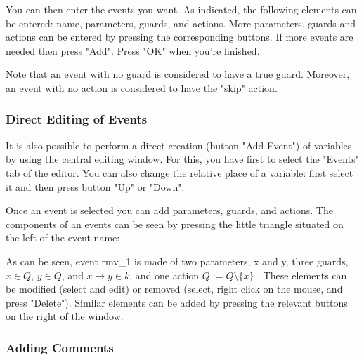 You can then enter the events you want. As indicated, the following elements can be entered: name, parameters, guards, and actions. More parameters, guards and actions can be entered by pressing the corresponding buttons. If more events are needed then press "Add". Press "OK" when you’re finished.

Note that an event with no guard is considered to have a true guard. Moreover, an event with no action is considered to have the "skip" action. 

\subsubsection{Direct Editing of Events}

It is also possible to perform a direct creation (button "Add Event") of variables by using the central editing window. For this, you have first to select the "Events" tab of the editor. You can also change the relative place of a variable: first select it and then press button "Up" or "Down".


Once an event is selected you can add parameters, guards, and actions. The components of an events can be seen by pressing the little triangle situated on the left of the event name: 


As can be seen, event rmv\_1 is made of two parameters, x and y, three guards, $x \in Q$, $y \in Q$, and $x \mapsto y \in k$, and one action $Q := Q \setminus \{ x\}$ . These elements can be modified (select and edit) or removed (select, right click on the mouse, and press "Delete"). Similar elements can be added by pressing the relevant buttons on the right of the window. 

\subsubsection{Adding Comments}

